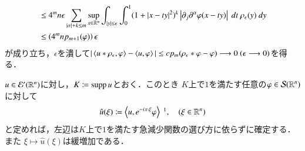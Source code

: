 \begin{prf}
\begin{description}
\begin{align}
					&\leq 4^m n \epsilon \sum_{|\alpha| + k \leq m} 
						\operatorname*{sup}_{x \in \mathbb{R}^n} \int_{|y| \leq \epsilon} \int_0^1 (1+|x-ty|^2)^k \left| \partial_j \partial^\alpha \varphi(x-ty) \right|\ dt\ \rho_\epsilon(y)\ dy \\
					&\leq \left( 4^m n p_{m+1}(\varphi) \right) \epsilon 
				\end{align}
				が成り立ち，$\epsilon$を潰して$|\inprod<u \ast \rho_\epsilon, \varphi> - \inprod<u, \varphi>| 
				\leq c p_m(\rho_\epsilon \ast \varphi - \varphi) \longrightarrow 0\ (\epsilon \longrightarrow 0)$を得る．
				\QED
		\end{description}
	\end{prf}
	
	\begin{screen}
		\begin{thm}[コンパクト台を持つ緩増加超関数のFourier変換]
			$u \in \mathcal{E}'(\mathbb{R}^n)$に対し，$K \coloneqq \operatorname{supp} u$とおく．このとき
			$K$上で$1$を満たす任意の$\varphi \in \mathcal{S}(\mathbb{R}^n)$に対して
			\begin{align}
				\hat{u}(\xi) \coloneqq \inprod<u,\exp{-ix \cdot \xi}\varphi>\ \footnotemark,
				\quad (\xi \in \R^n)
			\end{align}
			と定めれば，左辺は$K$上で$1$を満たす急減少関数の選び方に依らずに確定する．また
			$\xi \longmapsto \hat{u}(\xi)$は緩増加である．
		\end{thm}
	\end{screen}
